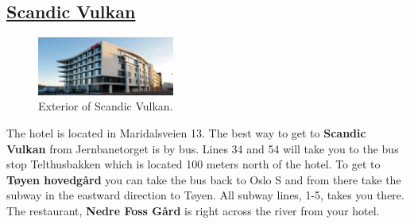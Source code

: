 \documentclass{article}
\begin{document}
%
%


\begingroup
\subsection*{\underline{Scandic Vulkan}}\setlength\intextsep{0pt}
\begin{figure}
\centering
\vspace{-4pt}
\includegraphics[width=0.40\textwidth, height=0.30\textwidth]{img/scandic-vulkan.jpg}
\caption{\label{fig:frog1}Exterior of Scandic Vulkan.}
\end{figure}
The hotel is located in Maridalsveien 13.
The best way to get to \textbf{Scandic Vulkan} from
Jernbanetorget is by bus. Lines 34 and 54 will take you
to the bus stop Telthusbakken which is located 100 meters
north of the hotel. To get to \textbf{Tøyen hovedgård}
you can take the bus back to Oslo S and from there take
the subway in the eastward direction to Tøyen. All subway
lines, 1-5, takes you there. The restaurant, \textbf{Nedre Foss Gård}
is right across the river from your hotel.
\end{document}

